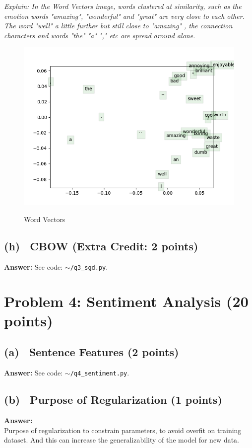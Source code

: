 \documentclass[fleqn]{MJD}
\newcommand{\problem}[1]{\chapter{Problem #1}}
\newcommand{\subproblem}[2]{\section{(#1)~ #2}}
\newcommand{\0}{\emptyset}
\begin{document}
\textit {Explain: In the Word Vectors image, words clustered at similarity, such as the emotion words "amazing", "wonderful" and "great" are very close to each other. The word "well" a little further but still close to "amazing"  , the connection characters and words "the" "a" "," etc are spread around alone.
}

\begin{figure}[!htbp]\centering
	\includegraphics[scale=1.0]{q3_word_vectors.png}
	\label{figure:wordvectors}
	\caption{Word Vectors}
\end{figure}


\subproblem{h}{CBOW (Extra Credit: 2 points)}

\noindent \textbf{Answer:}  See code: $\sim$\verb|/q3_sgd.py|. \\




\newpage
\problem{4: Sentiment Analysis (20 points)}

\subproblem{a}{Sentence Features (2 points)}

\noindent \textbf{Answer:}  See code: $\sim$\verb|/q4_sentiment.py|.

\subproblem{b}{Purpose of Regularization (1 points)}
\noindent \textbf{Answer:} \\

\noindent Purpose of regularization to constrain parameters, to avoid overfit on training dataset. And this can increase the generalizability of the model for new data.
\end{document}
